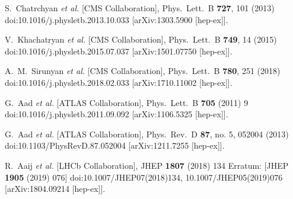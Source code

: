 \documentclass[12pt]{article}
\begin{document}
\begin{thebibliography}{1}
  S.~Chatrchyan {\it et al.} [CMS Collaboration],
  Phys.\ Lett.\ B {\bf 727}, 101 (2013)
  doi:10.1016/j.physletb.2013.10.033
  [arXiv:1303.5900 [hep-ex]].

  V.~Khachatryan {\it et al.} [CMS Collaboration],
  Phys.\ Lett.\ B {\bf 749}, 14 (2015)
  doi:10.1016/j.physletb.2015.07.037
  [arXiv:1501.07750 [hep-ex]].


  A.~M.~Sirunyan {\it et al.} [CMS Collaboration],
  Phys.\ Lett.\ B {\bf 780}, 251 (2018)
  doi:10.1016/j.physletb.2018.02.033
  [arXiv:1710.11002 [hep-ex]].


  G.~Aad {\it et al.} [ATLAS Collaboration],
  Phys.\ Lett.\ B {\bf 705} (2011) 9
  doi:10.1016/j.physletb.2011.09.092
  [arXiv:1106.5325 [hep-ex]].

  G.~Aad {\it et al.} [ATLAS Collaboration],
  Phys.\ Rev.\ D {\bf 87}, no. 5, 052004 (2013)
  doi:10.1103/PhysRevD.87.052004
  [arXiv:1211.7255 [hep-ex]].


  R.~Aaij {\it et al.} [LHCb Collaboration],
  JHEP {\bf 1807} (2018) 134
   Erratum: [JHEP {\bf 1905} (2019) 076]
  doi:10.1007/JHEP07(2018)134, 10.1007/JHEP05(2019)076
  [arXiv:1804.09214 [hep-ex]].
  

\end{thebibliography}
\end{document}
